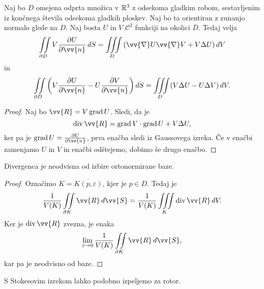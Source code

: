 
\begin{posledica}
Naj bo $D$ omejena odprta množica v $\mathbb{R}^3$ z odsekoma gladkim
robom, sestavljenim iz končnega števila odsekoma gladkih ploskev.
Naj bo ta orientiran z zunanjo normalo glede na $D$. Naj bosta $U$
in $V$ $\mathcal{C}^2$ funkciji na okolici $\overline{D}$. Tedaj
velja
\[
\liint_{\partial D} V \frac{\partial U}{\partial \vv{n}}\,dS =
\liiint_D \left(\vv{\nabla}U \vv{\nabla}V + V \Delta U\right) dV
\]
in
\[
\liint_{\partial D} \left(
V \frac{\partial U}{\partial \vv{n}} -
U \frac{\partial V}{\partial \vv{n}}\right)dS =
\liiint_D (V \Delta U - U \Delta V)\,dV.
\]
\end{posledica}

\begin{proof}
Naj bo $\vv{R} = V \grad U$. Sledi, da je
\[
\dv \vv{R} = \grad V \cdot \grad U + V \Delta U,
\]
ker pa je $\grad U = \frac{\partial U}{\partial \vv{n}}$, prva
enačba sledi iz Gaussovega izreka. Če v enačbi zamenjamo $U$ in $V$
in enačbi odštejemo, dobimo še drugo enačbo.
\end{proof}

\begin{posledica}
Divergenca je neodvisna od izbire ortonormirane baze.
\end{posledica}

\begin{proof}
Označimo $K = \overline{K(p, \varepsilon)}$, kjer je $p \in D$.
Tedaj je
\[
\frac{1}{V(K)} \liint_{\partial K} \vv{R}\,d\vv{S} =
\frac{1}{V(K)} \liiint_K \dv \vv{R}\,dV.
\]
Ker je $\dv \vv{R}$ zvezna, je enaka
\[
\lim_{\varepsilon \to 0}
\frac{1}{V(K)} \liint_{\partial K} \vv{R}\,d\vv{S},
\]
kar pa je neodvisno od baze.
\end{proof}

\begin{opomba}
S Stokesovim izrekom lahko podobno izpeljemo za rotor.
\end{opomba}

